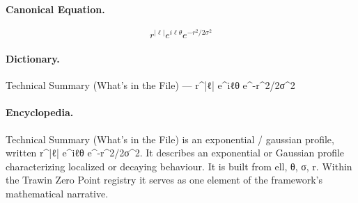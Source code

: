 \paragraph{Canonical Equation.}
\[
r^{|\ell|} e^{i\ell\theta} e^{-r^2/2\sigma^2}
\]

\paragraph{Dictionary.}
Technical Summary (What’s in the File) — r\textasciicircum{}|ℓ| e\textasciicircum{}iℓθ e\textasciicircum{}-r\textasciicircum{}2/2σ\textasciicircum{}2

\paragraph{Encyclopedia.}
Technical Summary (What’s in the File) is an exponential / gaussian profile, written r\textasciicircum{}|ℓ| e\textasciicircum{}iℓθ e\textasciicircum{}-r\textasciicircum{}2/2σ\textasciicircum{}2. It describes an exponential or Gaussian profile characterizing localized or decaying behaviour. It is built from ell, θ, σ, r. Within the Trawin Zero Point registry it serves as one element of the framework's mathematical narrative.
